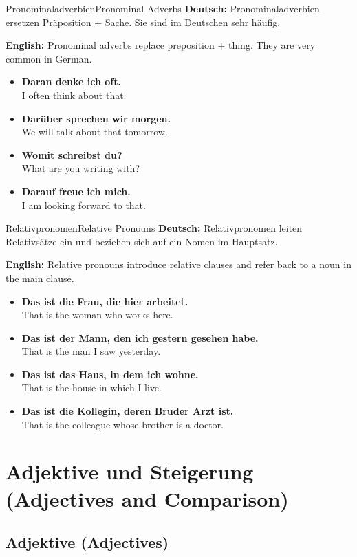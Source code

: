 \documentclass[a4paper,11pt]{article}
\newcommand{\GermanText}[1]{\textbf{Deutsch: }#1\par}
\newcommand{\EnglishText}[1]{{\color{SoftGray}\textbf{English: }#1\par}}
\newcommand{\ExampleItem}[2]{\item \textbf{#1}\\{\color{SoftGray}#2}}
\begin{document}
\begin{grammarentry}{Pronominaladverbien}{Pronominal Adverbs}
    \GermanText{Pronominaladverbien ersetzen Präposition + Sache. Sie sind im Deutschen sehr häufig.}
    \EnglishText{Pronominal adverbs replace preposition + thing. They are very common in German.}
    \begin{exbox}
        \begin{itemize}
            \ExampleItem{Daran denke ich oft.}{I often think about that.}
            \ExampleItem{Darüber sprechen wir morgen.}{We will talk about that tomorrow.}
            \ExampleItem{Womit schreibst du?}{What are you writing with?}
            \ExampleItem{Darauf freue ich mich.}{I am looking forward to that.}
        \end{itemize}
    \end{exbox}
\end{grammarentry}

\begin{grammarentry}{Relativpronomen}{Relative Pronouns}
    \GermanText{Relativpronomen leiten Relativsätze ein und beziehen sich auf ein Nomen im Hauptsatz.}
    \EnglishText{Relative pronouns introduce relative clauses and refer back to a noun in the main clause.}
    \begin{exbox}
        \begin{itemize}
            \ExampleItem{Das ist die Frau, die hier arbeitet.}{That is the woman who works here.}
            \ExampleItem{Das ist der Mann, den ich gestern gesehen habe.}{That is the man I saw yesterday.}
            \ExampleItem{Das ist das Haus, in dem ich wohne.}{That is the house in which I live.}
            \ExampleItem{Das ist die Kollegin, deren Bruder Arzt ist.}{That is the colleague whose brother is a doctor.}
        \end{itemize}
    \end{exbox}
\end{grammarentry}

\section{Adjektive und Steigerung {\small (Adjectives and Comparison)}}

\subsection{Adjektive {\small (Adjectives)}}
\end{document}
